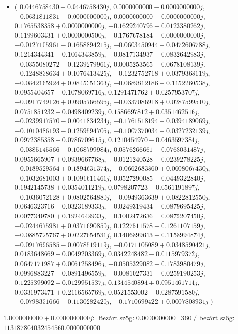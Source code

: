 \documentclass[14pt,a4paper]{article}
\begin{document}
\begin{itemize}
\item
$\big($
$0.0446758430-0.0446758430j$, $0.0000000000-0.0000000000j$, $-0.0631811831-0.0000000000j$, $0.0000000000+0.0000000000j$, $0.1765538358+0.0000000000j$, $-0.1629240796+0.0123380262j$, $0.1199603431+0.0000000500j$, $-0.1767678184+0.0000000000j$, $-0.0127105961-0.1658894216j$, $-0.0603450944-0.0472606788j$, $0.1214344341-0.1064343859j$, $-0.0817134937-0.0832642983j$, $-0.0355080272-0.1239279961j$, $0.0005253565+0.0678108139j$, $-0.1248838634+0.1076413425j$, $-0.1232752718+0.0379368119j$, $-0.0842165924+0.0845351363j$, $-0.0689812186-0.1152260538j$, $0.0955404657-0.1078069716j$, $0.1291471762+0.0257953707j$, $-0.0917749126+0.0905766596j$, $-0.0337086918+0.0287599510j$, $0.0751851232-0.0498409239j$, $0.1586697812+0.0351462516j$, $-0.0239917570-0.0041834234j$, $-0.1761518194-0.0394189069j$, $-0.1010486193-0.1259594705j$, $-0.1007370034-0.0327232139j$, $0.0972385358-0.0786709615j$, $0.1210454970-0.0463597384j$, $-0.0385145566-0.1068799984j$, $0.0576266661+0.0768031487j$, $0.0955665907+0.0939667768j$, $-0.0121240528-0.0239278225j$, $-0.0189529564+0.1894631374j$, $-0.0662683860+0.0608067430j$, $-0.1032681003+0.1091611461j$, $0.0527290085-0.0449322840j$, $0.1942145738+0.0354011219j$, $0.0798207723-0.0561191897j$, $-0.1036072128+0.0802564880j$, $-0.0949363639+0.0822812550j$, $0.0646323716-0.0323189333j$, $-0.0249319434+0.0879695425j$, $0.0077349780+0.1924648933j$, $-0.1002472636-0.0875207450j$, $-0.0244675981+0.0371690850j$, $0.1227511578-0.1261107159j$, $-0.0885725767+0.0227654531j$, $0.1406899613+0.1158994874j$, $-0.0917696585-0.0078519119j$, $-0.0171105089+0.0348590421j$, $0.0183648669-0.0049203369j$, $0.0342248482-0.0115979372j$, $0.0647171987+0.0061258496j$, $-0.0505329082+0.1783980479j$, $0.0996883227-0.0891496559j$, $-0.0081027331-0.0259190253j$, $0.1225399092-0.0129951537j$, $0.1344540894+0.0951461714j$, $0.0331973471+0.2116565769j$, $0.0521553002-0.0287591580j$, $-0.0798331666-0.1130282420j$, $-0.1710699422+0.0007808931j$
$\big)$
\end{itemize}
$1.0000000000+0.0000000000j$:\
Bezárt szög: $0.0000000000$ \
360 / bezárt szög: $113187804032454560.0000000000$\
\end{document}
